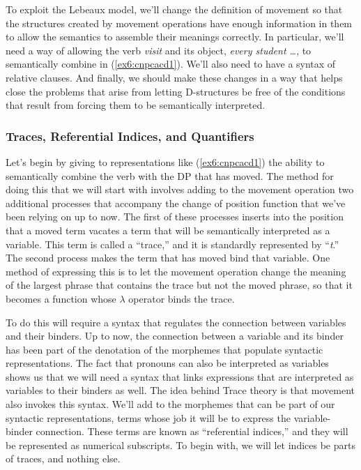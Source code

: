 To exploit the Lebeaux model, we'll change the definition of movement so that the structures created by movement operations have enough information in them to allow the semantics to assemble their meanings correctly. In particular, we'll need a way of allowing the verb \emph{visit} and its object, \emph{every student \ldots}, to semantically combine in (\ref{ex6:cnpcacd1}). We'll also need to have a syntax of relative clauses. And finally, we should make these changes in a way that helps close the problems that arise from letting D-structures be free of the conditions that result from forcing them to be semantically interpreted.

\subsubsection{Traces, Referential Indices, and Quantifiers}
\label{sec:traces}

Let's begin by giving to representations like (\ref{ex6:cnpcacd1}) the ability to semantically combine the verb with the DP that has moved. The method for doing this that we will start with involves adding to the movement operation two additional processes that accompany the change of position function that we've been relying on up to now. The first of these processes inserts into the position that a moved term vacates a term that will be semantically interpreted as a variable. This term is called a ``trace,'' and it is standardly represented by ``\emph{t}.'' %
%
%
%
The second process makes the term that has moved bind that variable. One method of expressing this is to let the movement operation change the meaning of the largest phrase that contains the trace but not the moved phrase, so that it becomes a function whose $\lambda$ operator binds the trace. 

To do this will require a syntax that regulates the connection between variables and their binders. Up to now, the connection between a variable and its binder has been part of the denotation of the morphemes that populate syntactic representations. The fact that pronouns can also be interpreted as variables shows us that we will need a syntax that links expressions that are interpreted as variables to their binders as well. The idea behind Trace theory is that movement also invokes this syntax. We'll add to the morphemes that can be part of our syntactic representations, terms whose job it will be to express the variable-binder connection. These terms are known as ``referential indices,'' and they will be represented as numerical subscripts. To begin with, we will let indices be parts of traces, and nothing else.

